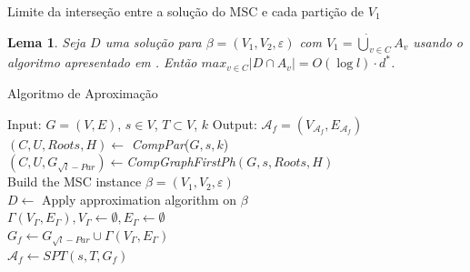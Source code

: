 \documentclass[10pt]{beamer}
\newtheorem{lema}{Lema}
\begin{document}
\begin{frame}{Limite da interseção entre a solução do MSC e cada partição de $V_1$}
  \begin{lema}
    \label{lem:max_pseudo_node_degree}
    Seja $D$ uma solução para $\beta=(V_1, V_2, \varepsilon)$ com $V_1 = \dot \bigcup_{v \in C}A_v$ usando o algoritmo apresentado em \cite{Chekuri2004}. 
Então $max_{v \in C}|D \cap A_v| = O(\log l)\cdot d^*$.
  \end{lema}
\hypertarget{max_pseudo_node_degree}{}
\hyperlink{max_pseudo_node_degree_slide}{}
\end{frame}

\begin{frame}{Algoritmo de Aproximação}
\begin{algorithm}[H]
Input: $G=(V, E)$, $s \in V$, $T \subset V$, $k$ \linebreak
Output: $\mathcal{A}_f =(V_{\mathcal{A}_f}, E_{\mathcal{A}_f})$ \linebreak
\BlankLine
  $(C, U, Roots, H) \gets$ \emph{CompPar}($G, s, k$) \\ 
  $(C, U, G_{\sqrt{l}-Par})\gets $\emph{CompGraphFirstPh}$(G,s,Roots,H)$ \\	
  Build the MSC instance $\beta = (V_1, V_2, \varepsilon)$ \\
  $D \gets $ Apply approximation algorithm \cite{Chekuri2004} on $\beta$\\
  $\varGamma(V_{\varGamma},E_{\varGamma}), V_{\varGamma} \gets \emptyset, E_{\varGamma} \gets \emptyset$\\
  $G_f \gets G_{\sqrt{l}-Par} \cup \varGamma(V_\varGamma,E_\varGamma)$ \\
  $\mathcal{A}_f \gets SPT(s, T, G_f)$
\caption{Algoritmo de Aproximação para o DSMDStP} 
\label{alg:approximation}
\end{algorithm}
\end{frame}
\end{document}
